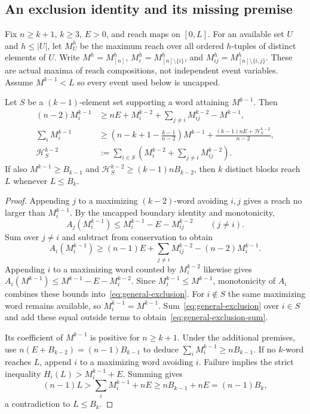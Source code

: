 \subsection{An exclusion identity and its missing premise}

Fix $n\ge k+1$, $k\ge3$, $E>0$, and reach maps on $[0,L]$.
For an available set $U$ and $h\le |U|$, let $M_U^h$ be the maximum
reach over all ordered $h$-tuples of distinct elements of $U$.
Write $M^h=M_{[n]}^h$, $M_i^h=M_{[n]\setminus\{i\}}^h$, and
$M_{ij}^h=M_{[n]\setminus\{i,j\}}^h$. These are actual maxima of
reach compositions, not independent event variables. Assume
$M^{k-1}<L$ so every event used below is uncapped.

\begin{lemma}\label{lem:general-exclusion}
Let $S$ be a $(k-1)$-element set supporting a word attaining $M^{k-1}$.
Then
\begin{align}
 (n-2)M_i^{k-1}
 &\ge nE+M_i^{k-2}+\sum_{j\ne i}M_{ij}^{k-2}-M^{k-1},
       \label{eq:general-exclusion}\\
 \sum_iM_i^{k-1}
 &\ge\left(n-k+1-\frac{k-1}{n-2}\right)M^{k-1}
       +\frac{(k-1)nE+\mathcal H_S^{k-2}}{n-2},
       \label{eq:general-exclusion-sum}\\
 \mathcal H_S^{k-2}
 &:=\sum_{i\in S}\left(M_i^{k-2}+\sum_{j\ne i}M_{ij}^{k-2}\right).
       \label{eq:general-weighted-H}
\end{align}
If also $M^{k-1}\ge B_{k-1}$ and
$\mathcal H_S^{k-2}\ge(k-1)nB_{k-2}$, then $k$ distinct blocks reach
$L$ whenever $L\le B_k$.
\end{lemma}
\begin{proof}
Appending $j$ to a maximizing $(k-2)$-word avoiding $i,j$ gives a
reach no larger than $M_i^{k-1}$. By the uncapped boundary identity
and monotonicity,
\[
 A_j(M_i^{k-1})\le M_i^{k-1}-E-M_{ij}^{k-2}\qquad(j\ne i).
\]
Sum over $j\ne i$ and subtract from conservation to obtain
\[
 A_i(M_i^{k-1})\ge(n-1)E+\sum_{j\ne i}M_{ij}^{k-2}
                              -(n-2)M_i^{k-1}.
\]
Appending $i$ to a maximizing word counted by $M_i^{k-2}$ likewise
gives $A_i(M^{k-1})\le M^{k-1}-E-M_i^{k-2}$.
Since $M_i^{k-1}\le M^{k-1}$, monotonicity of $A_i$ combines these
bounds into~\eqref{eq:general-exclusion}. For $i\notin S$ the same
maximizing word remains available, so $M_i^{k-1}=M^{k-1}$.
Sum~\eqref{eq:general-exclusion} over $i\in S$ and add these equal
outside terms to obtain~\eqref{eq:general-exclusion-sum}.

Its coefficient of $M^{k-1}$ is positive for $n\ge k+1$.
Under the additional premises, use
$n(E+B_{k-2})=(n-1)B_{k-1}$ to deduce
$\sum_iM_i^{k-1}\ge nB_{k-1}$. If no $k$-word reaches $L$, append
$i$ to a maximizing word avoiding $i$. Failure implies the strict
inequality $H_i(L)>M_i^{k-1}+E$. Summing gives
\[
 (n-1)L>\sum_iM_i^{k-1}+nE
             \ge nB_{k-1}+nE=(n-1)B_k,
\]
a contradiction to $L\le B_k$.
\end{proof}


